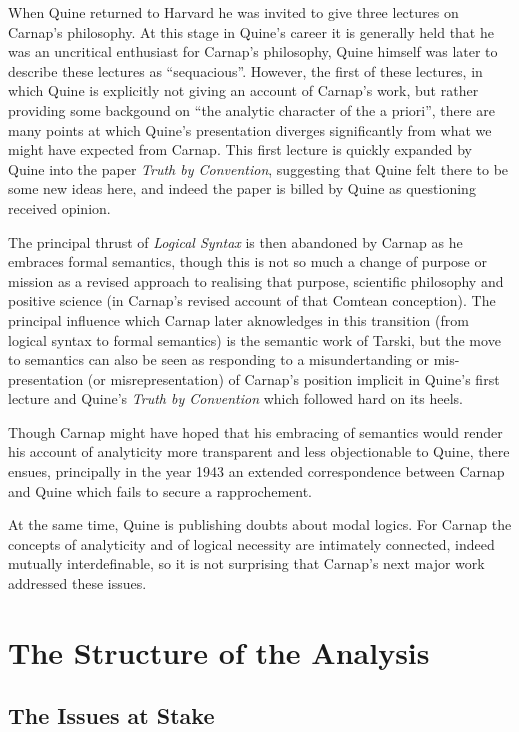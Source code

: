 When Quine returned to Harvard he was invited to give three
lectures on Carnap's philosophy.  
At this stage in Quine's career it is generally held that
he was an uncritical enthusiast for Carnap's philosophy,
Quine himself was later to describe these lectures as ``sequacious''.
However, the first of these lectures, in which Quine is explicitly
not giving an account of Carnap's work, but rather providing some
backgound on ``the analytic character of the a priori'', there
are many points at which Quine's presentation diverges significantly
from what we might have expected from Carnap.
This first lecture is quickly expanded by Quine into the paper
{\it Truth by Convention}\cite{quine36}, suggesting that Quine
felt there to be some new ideas here, and indeed the paper is
billed by Quine as questioning received opinion.

The principal thrust of {\it Logical Syntax} is then abandoned by
Carnap as he embraces formal semantics, though this is not so
much a change of purpose or mission as a revised approach to realising
that purpose, scientific philosophy and positive science
(in Carnap's revised account of that Comtean conception).
The principal influence which Carnap later aknowledges in this
transition (from logical syntax to formal semantics) is the
semantic work of Tarski, but the move to semantics can also
be seen as responding to a misundertanding or mis-presentation
(or misrepresentation) of Carnap's position implicit in Quine's
first lecture and Quine's {\it Truth by Convention} \cite{quine36}
which followed hard on its heels.

Though Carnap might have hoped that his embracing of semantics
would render his account of analyticity more transparent and less
objectionable to Quine, there ensues, principally in the year 1943
an extended correspondence between Carnap and Quine \cite{carnap90}
which fails to secure a rapprochement.

At the same time, Quine is publishing doubts about modal logics.
For Carnap the concepts of analyticity and of logical necessity
are intimately connected, indeed mutually interdefinable, so
it is not surprising that Carnap's next major work addressed these
issues.

\section{The Structure of the Analysis}

\subsection{The Issues at Stake}


